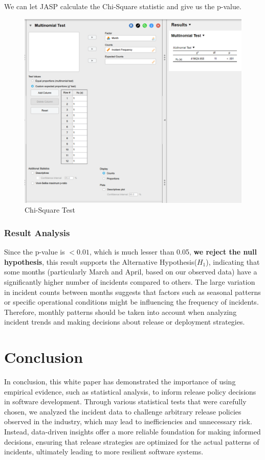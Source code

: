\documentclass{article}
\begin{document}
We can let JASP calculate the Chi-Square statistic and give us the p-value.

\begin{figure} [H]
    \centering
    \includegraphics[width=0.5\linewidth]{Screenshot 2024-10-20 170522.png}
    \caption{Chi-Square Test}
    \label{fig:enter-label}
\end{figure}

\subsubsection{Result Analysis}

Since the p-value is $< 0.01$, which is much lesser than 0.05, \textbf{we reject the null hypothesis}, this result supports the Alternative Hypothesis($H_1$), indicating that some months (particularly March and April, based on our observed data) have a significantly higher number of incidents compared to others. The large variation in incident counts between months suggests that factors such as seasonal patterns or specific operational conditions might be influencing the frequency of incidents. Therefore, monthly patterns should be taken into account when analyzing incident trends and making decisions about release or deployment strategies.

\section{Conclusion}

In conclusion, this white paper has demonstrated the importance of using empirical evidence, such as statistical analysis, to inform release policy decisions in software development. Through various statistical tests that were carefully chosen, we analyzed the incident data to challenge arbitrary release policies observed in the industry, which may lead to inefficiencies and unnecessary risk. Instead, data-driven insights offer a more reliable foundation for making informed decisions, ensuring that release strategies are optimized for the actual patterns of incidents, ultimately leading to more resilient software systems.
\end{document}
